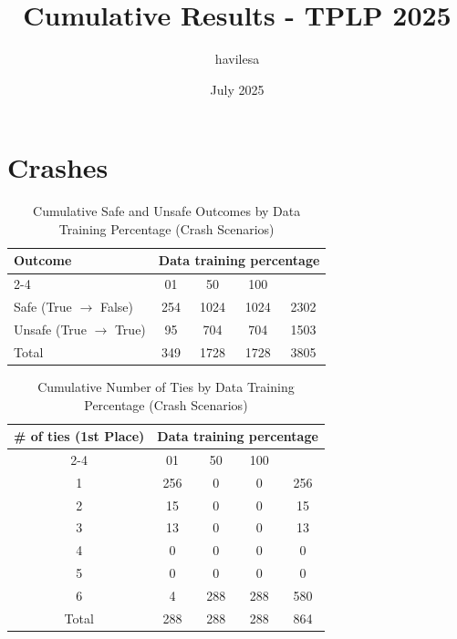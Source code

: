 \documentclass{article}
\title{Cumulative Results - TPLP 2025}
\author{havilesa}
\date{July 2025}
\begin{document}
\maketitle

\section{Crashes}
\begin{table}[h]
\centering
\caption{Cumulative Safe and Unsafe Outcomes by Data Training Percentage (Crash Scenarios)}
\begin{tabular}{l|ccc|c}
\toprule
\multirow{2}{*}{Outcome} & \multicolumn{5}{c|}{Data training percentage} & \multirow{2}{*}{Total} \\
\cmidrule{2-4}
 & 01 & 50 & 100 & \\
\midrule
Safe (True $\rightarrow$ False) & 254 & 1024 & 1024 & 2302 \\ 
Unsafe (True $\rightarrow$ True) & 95 & 704 & 704 & 1503 \\ 
\midrule
Total & 349 & 1728 & 1728 & 3805 \\ 
\bottomrule
\end{tabular}
\end{table}

\begin{table}[h]
\centering
\caption{Cumulative Number of Ties by Data Training Percentage (Crash Scenarios)}
\begin{tabular}{c|ccc|c}
\toprule
\multirow{2}{*}{\# of ties (1st Place)} & \multicolumn{5}{c|}{Data training percentage} & \multirow{2}{*}{Total} \\
\cmidrule{2-4}
 & 01 & 50  & 100 & \\
\midrule
1 & 256 & 0 & 0 & 256 \\ 
2 & 15 & 0 & 0 & 15 \\ 
3 & 13 & 0 & 0 & 13 \\ 
4 & 0 & 0 & 0 & 0 \\ 
5 & 0 & 0 & 0 & 0 \\ 
6 & 4 & 288 & 288 & 580 \\ 
\midrule
Total & 288 & 288 & 288 & 864 \\ 
\bottomrule
\end{tabular}
\end{table}
\end{document}
